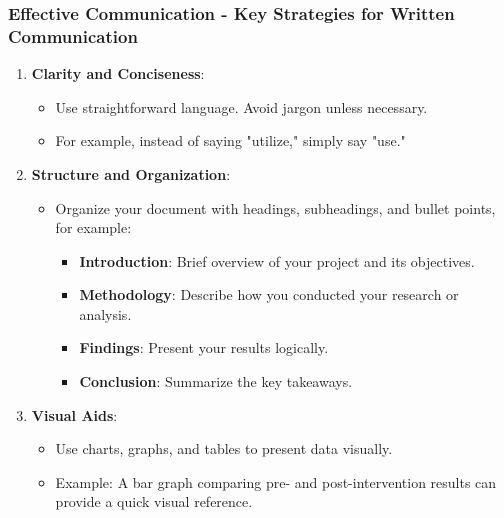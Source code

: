 \documentclass[aspectratio=169]{beamer}
\begin{document}
\begin{frame}[fragile]
  \frametitle{Effective Communication - Key Strategies for Written Communication}
  \begin{enumerate}
    \item \textbf{Clarity and Conciseness}: 
    \begin{itemize}
        \item Use straightforward language. Avoid jargon unless necessary. 
        \item For example, instead of saying "utilize," simply say "use."
    \end{itemize}
    
    \item \textbf{Structure and Organization}:
    \begin{itemize}
        \item Organize your document with headings, subheadings, and bullet points, for example:
        \begin{itemize}
            \item \textbf{Introduction}: Brief overview of your project and its objectives.
            \item \textbf{Methodology}: Describe how you conducted your research or analysis.
            \item \textbf{Findings}: Present your results logically.
            \item \textbf{Conclusion}: Summarize the key takeaways.
        \end{itemize}
    \end{itemize}
    
    \item \textbf{Visual Aids}:
    \begin{itemize}
        \item Use charts, graphs, and tables to present data visually.
        \item Example: A bar graph comparing pre- and post-intervention results can provide a quick visual reference.
    \end{itemize}
  \end{enumerate}
\end{frame}
\end{document}
